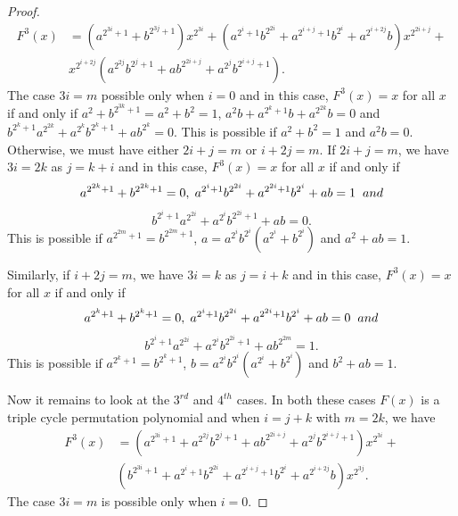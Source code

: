 \documentclass[12pt,a4paper]{article}
\begin{document}
\begin{proof}
	\begin{equation}
		\begin{split}
			F^{3}(x)&=(a^{2^{3i}+1}+b^{2^{3j}+1})x^{2^{3i}}+(a^{2^{i}+1}b^{2^{2i}}+a^{2^{i+j}+1}b^{2^{i}}+a^{2^{i+2j}}b)x^{2^{2i+j}}+\\
			&x^{2^{i+2j}}(a^{2^{2j}}b^{2^{j}+1}+ab^{2^{2i+j}}+a^{2^{j}}b^{2^{i+j}+1}).
		\end{split}
	\end{equation}
	The case  $ 3i=m $ possible only when $ i=0 $ and in this case, $ F^{3}(x)=x $ for all $ x $ if and only if $ a^{2}+b^{2^{3k}+1}=a^{2}+b^{2}=1$, $ a^{2}b+a^{2^{k}+1}b+a^{2^{2k}}b=0 $ and $ b^{2^{k}+1}a^{2^{2k}}+a^{2^{k}}b^{2^{k}+1}+ab^{2^{k}}=0 $. This is possible if $ a^{2}+b^{2}=1  $ and $ a^{2}b=0   $. Otherwise, we must have either $ 2i+j=m $ or $ i+2j=m $. If $ 2i+j=m $, we have  $ 3i=2k $ as $ j=k+i $ and in this case, $ F^{3}(x)=x $ for all $ x $ if and only if 
	\begin{equation}
		a^{2^{2k}+1}+b^{2^{2k}+1}=0,\hspace{.1cm} a^{2^{i}+1}b^{2^{2i}}+a^{2^{2i}+1}b^{2^{i}}+ab=1\hspace{.2cm} and 
	\end{equation}
	\begin{equation}
		b^{2^{i}+1}a^{2^{2i}}+a^{2^{i}}b^{2^{2i}+1}+ab=0.
	\end{equation}
	This is possible if $ a^{2^{2m}+1}=b^{2^{2m}+1} $, $ a=a^{2^{i}}b^{2^{i}}(a^{2^{i}}+b^{2^{i}}) $ and $ a^{2}+ab=1 $.
	
	
	Similarly, if $ i+2j=m $, we have  $ 3i=k $ as $ j=i+k $ and in this case, $ F^{3}(x)=x $ for all $ x $ if and only if
	\begin{equation}
		a^{2^{k}+1}+b^{2^{k}+1}=0,\hspace{.1cm} a^{2^{i}+1}b^{2^{2i}}+a^{2^{2i}+1}b^{2^{i}}+ab=0\hspace{.2cm} and 
	\end{equation}
	\begin{equation}
		b^{2^{i}+1}a^{2^{2i}}+a^{2^{i}}b^{2^{2i}+1}+ab^{2^{2m}}=1.
	\end{equation}
	This is possible if $ a^{2^{k}+1}=b^{2^{k}+1} $, $ b=a^{2^{i}}b^{2^{i}}(a^{2^{i}}+b^{2^{i}}) $ and $ b^{2}+ab=1 $.
	
	
	Now it remains to look at the $3^{rd}$ and $4^{th}$ cases. In both these cases  $ F(x) $ is a triple cycle permutation polynomial and when $ i=j+k $ with $ m=2k $, we have 
	\begin{equation}
		\begin{split}
			F^{3}(x)&=(a^{2^{3i}+1}+a^{2^{2j}}b^{2^{j}+1}+ab^{2^{2i+j}}+a^{2^{j}}b^{2^{i+j}+1})x^{2^{3i}}+\\
			&(b^{2^{3i}+1}+a^{2^{i}+1}b^{2^{2i}}+a^{2^{i+j}+1}b^{2^{i}}+a^{2^{i+2j}}b)x^{2^{3j}}.
		\end{split}
	\end{equation}
	The case $ 3i=m $ is possible only when $ i=0 $. 
	

\end{proof}
\end{document}
